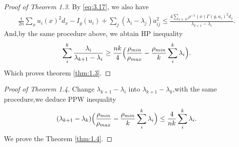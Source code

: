 \documentclass[11pt]{article}
\theoremstyle{definition}
\theoremstyle{remark}
\numberwithin{equation}{section}
\begin{document}
\begin{proof}[Proof of Theorem 1.3]
By \eqref{eq:3.17}, we also have
\begin{align}
\frac{1}{2n}\sum_{x}u_i(x)^2d_x-I_g(u_i)+\sum_{j}(\lambda_i-\lambda_j)a_{ij}^2\le \frac{4\sum_{x\in\Omega}\rho^{-1}(x)\Gamma(g,u_i)^2d_x}
    {\lambda_{k+1}-\lambda_{i}}.
\end{align} 
And,by the same procedure above, we abtain HP inequality
\begin{align*}
\sum_{i}^{k}\frac{\lambda_i}{\lambda_{k+1}-\lambda_i}\ge \frac{nk}{4}\Bigl(\frac{\rho_{min}}{\rho_{max}}-\frac{\rho_{min}}{k}\sum_{i}^{k}\lambda_i\Bigr).
\end{align*}
Which proves theorem \ref{thm:1.3}.
\end{proof}
\begin{proof}[Proof of Theorem 1.4]
Change $\lambda_{k+1}-\lambda_i$ into $\lambda_{k+1}-\lambda_{k}$,with the same procedure,we deduce PPW inequality
\begin{align*}
(\lambda_{k+1}-\lambda_k)\Bigl(\frac{\rho_{min}}{\rho_{max}}-\frac{\rho_{min}}{k}\sum_{i}^{k}\lambda_i\Bigr)\le\frac{4}{nk}\sum_{i}^{k}\lambda_i.
\end{align*}
We prove the Theorem \ref{thm:1.4}.
\end{proof}


\end{document}
